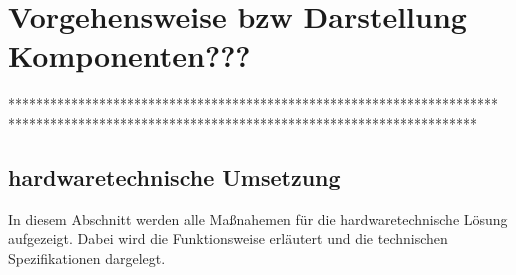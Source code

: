 \chapter{Vorgehensweise bzw Darstellung Komponenten???}
**********************************************************************
*******************************************************************

\section{hardwaretechnische Umsetzung}
In diesem Abschnitt werden alle Maßnahemen für die hardwaretechnische Lösung aufgezeigt. Dabei wird die Funktionsweise erläutert und die technischen Spezifikationen dargelegt.
